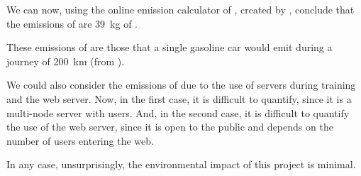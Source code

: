 We can now, using the online emission calculator of , created by
, conclude that the emissions of  are
\SI{39}{\kg} of .

\begin{exampleBox}
  These emissions of  are those that a single gasoline car would emit
  during a journey of \SI{200}{\km} (from \cite{aragon21:emiss_calcul}).
\end{exampleBox}

We could also consider the emissions of  due to the use of servers
during training and the web server. Now, in the first case, it is difficult to
quantify, since it is a multi-node server with users. And, in the second case,
it is difficult to quantify the use of the web server, since it is open to the
public and depends on the number of users entering the web.

In any case, unsurprisingly, the environmental impact of this project is
minimal.